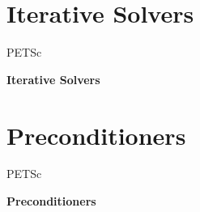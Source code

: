 




%
%

\section{Iterative Solvers}
\begin{frame}{PETSc}
   \begin{center} \Large \textbf{Iterative Solvers} \end{center}
\end{frame}









%
% 

\section{Preconditioners}
\begin{frame}{PETSc}
   \begin{center} \Large \textbf{Preconditioners} \end{center}
\end{frame}



%



